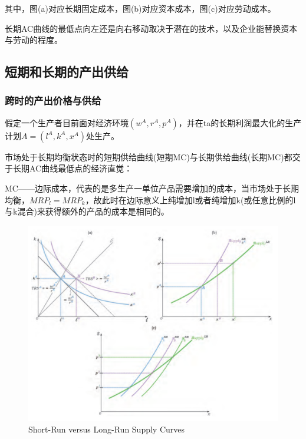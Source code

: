 \documentclass{article}
\begin{document}
其中，图(a)对应长期固定成本，图(b)对应资本成本，图(c)对应劳动成本。

长期AC曲线的最低点向左还是向右移动取决于潜在的技术，以及企业能替换资本与劳动的程度。

\subsection{短期和长期的产出供给}

\subsubsection{跨时的产出价格与供给}

假定一个生产者目前面对经济环境$ (w^A,r^A,p^A) $，并在ta的长期利润最大化的生产计划$ A=(l^A,k^A,x^A) $处生产。

市场处于长期均衡状态时的短期供给曲线(短期MC)与长期供给曲线(长期MC)都交于长期AC曲线最低点的经济直觉：

MC——边际成本，代表的是多生产一单位产品需要增加的成本，当市场处于长期均衡，$ MRP_l=MRP_k $，故此时在边际意义上纯增加l或者纯增加k(或任意比例的l与k混合)来获得额外的产品的成本是相同的。


\begin{figure}[H] %
	\centering %
	\includegraphics[width=1\textwidth]{13_6} %
	\caption{Short-Run versus Long-Run Supply Curves} %
	\label{Fig.main7} %
\end{figure}
\end{document}
